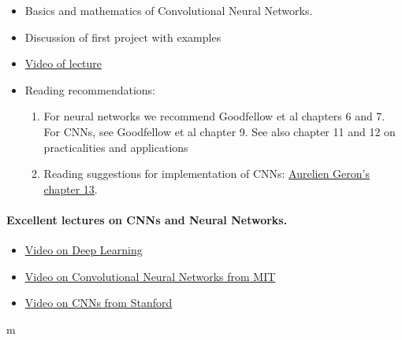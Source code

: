 \documentclass[%
oneside,                 %
final,                   %
10pt]{article}
\begin{document}
\begin{itemize}
\item Basics and mathematics of Convolutional  Neural Networks.

\item Discussion of first project with examples

\item \href{{https://youtu.be/}}{Video of lecture}

\item Reading recommendations:
\begin{enumerate}

 \item For neural networks we recommend Goodfellow et al chapters 6 and 7. For CNNs, see Goodfellow et al chapter 9. See also chapter 11 and 12 on practicalities and applications

 \item Reading suggestions for implementation of CNNs: \href{{https://github.com/CompPhysics/MachineLearning/blob/master/doc/Textbooks/TensorflowML.pdf}}{Aurelien Geron's chapter 13}. 
\end{enumerate}

\noindent
\end{itemize}

\noindent




\paragraph{Excellent lectures on CNNs and Neural Networks.}
\begin{itemize}
\item \href{{https://www.youtube.com/playlist?list=PLZHQObOWTQDNU6R1_67000Dx_ZCJB-3pi}}{Video on Deep Learning}

\item \href{{https://www.youtube.com/watch?v=iaSUYvmCekI&ab_channel=AlexanderAmini}}{Video  on Convolutional Neural Networks from MIT}

\item \href{{https://www.youtube.com/watch?v=bNb2fEVKeEo&list=PLC1qU-LWwrF64f4QKQT-Vg5Wr4qEE1Zxk&index=6&ab_channel=StanfordUniversitySchoolofEngineering}}{Video on CNNs from Stanford}
\end{itemize}

\noindent


m
\end{document}

